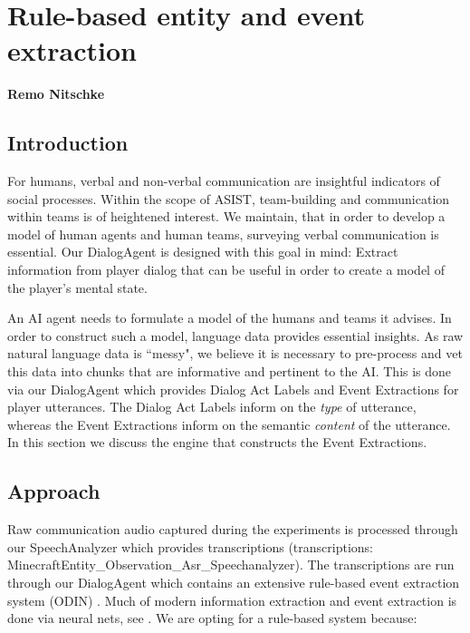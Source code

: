 \chapter{Rule-based entity and event extraction}
\label{ch:rule_based_ie}
\textbf{Remo Nitschke}

\section{Introduction}

For humans, verbal and non-verbal communication are insightful indicators of
social processes. Within the scope of ASIST, team-building and communication
within teams is of heightened interest. We maintain, that in order to develop a
model of human agents and human teams, surveying verbal communication is
essential. Our DialogAgent is designed with this goal in mind: Extract
information from player dialog that can be useful in order to create a model of
the player's mental state.

An AI agent needs to formulate a model of the humans and teams it advises. In
order to construct such a model, language data provides essential insights. As
raw natural language data is ``messy", we believe it is necessary to
pre-process and vet this data into chunks that are informative and pertinent to
the AI. This is done via our DialogAgent which provides Dialog Act Labels and
Event Extractions for player utterances. The Dialog Act Labels inform on the
\emph{type} of utterance, whereas the Event Extractions inform on the semantic
\emph{content} of the utterance. In this section we discuss the engine that
constructs the Event Extractions.

\section{Approach}


Raw communication audio captured during the experiments is processed through
our SpeechAnalyzer which provides transcriptions (transcriptions:
MinecraftEntity\_Observation\_Asr\_Speechanalyzer). The transcriptions are run
through our DialogAgent which contains an extensive rule-based event extraction
system (ODIN) \citep{valenzuela-escarcega-etal-2016-odins}. Much of modern
information extraction and event extraction is done via neural nets, see
\citet{Ahmad2021GATEGA,Du2020EventEB}. We are opting for a rule-based system
because:

